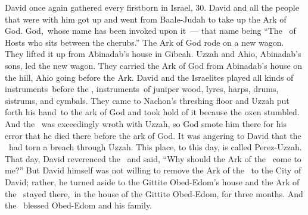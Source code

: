 
\begin{inparaenum}
   David once again gathered every firstborn in Israel, 30.%
   David and all the people that were with him got up and went from Baale-Judah to take up the Ark of God. God,\understood\ whose name has been invoked upon it~--- that name being ``The \lord\ of Hosts who sits between the cherubs.''%
   The Ark of God rode on a new wagon. They lifted it up from Abinadab's house in Gibeah. Uzzah and Ahio, Abinadab's sons, led the new wagon.%
   They carried the Ark of God from Abinadab's house on the hill, Ahio going before the Ark.%
   David and the Israelites played all kinds of instruments\understood\ before the \lord, instruments\understood\ of juniper wood, lyres, harps, drums, sistrums, and cymbals.%
   They came to Nachon's threshing floor and Uzzah put forth his hand\understood\ to the ark of God and took hold of it because the oxen stumbled.%
   And the \lord\ was exceedingly wroth with Uzzah, so God smote him there for his error that he died there before the ark of God.%
   It was angering to David that the \lord\ had torn a breach through Uzzah. This place, to this day, is called Perez-Uzzah.%
   That day, David reverenced the \lord\ and said, ``Why should the Ark of the \lord\ come to me?''%
   But David himself was not willing to remove the Ark of the \lord\ to the City of David; rather, he turned aside to the Gittite Obed-Edom's house%
   and the Ark of the \lord\ stayed there,\understood\ in the house of the Gittite Obed-Edom, for three months. And the \lord\ blessed Obed-Edom and his family.%

\end{inparaenum}
